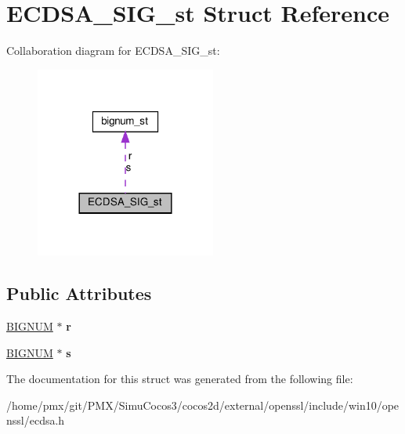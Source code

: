 \hypertarget{structECDSA__SIG__st}{}\section{E\+C\+D\+S\+A\+\_\+\+S\+I\+G\+\_\+st Struct Reference}
\label{structECDSA__SIG__st}


Collaboration diagram for E\+C\+D\+S\+A\+\_\+\+S\+I\+G\+\_\+st\+:
\nopagebreak
\begin{figure}[H]
\begin{center}
\leavevmode
\includegraphics[width=168pt]{structECDSA__SIG__st__coll__graph}
\end{center}
\end{figure}
\subsection*{Public Attributes}
\begin{DoxyCompactItemize}
\item 
\mbox{\label{structECDSA__SIG__st_aa4a144f7356b7e62243af763e584fd0f}} 
\hyperlink{structbignum__st}{B\+I\+G\+N\+UM} $\ast$ {\bfseries r}
\item 
\mbox{\label{structECDSA__SIG__st_a784f9869eb36cd84ea750b3ac58075ca}} 
\hyperlink{structbignum__st}{B\+I\+G\+N\+UM} $\ast$ {\bfseries s}
\end{DoxyCompactItemize}


The documentation for this struct was generated from the following file\+:\begin{DoxyCompactItemize}
\item 
/home/pmx/git/\+P\+M\+X/\+Simu\+Cocos3/cocos2d/external/openssl/include/win10/openssl/ecdsa.\+h\end{DoxyCompactItemize}

